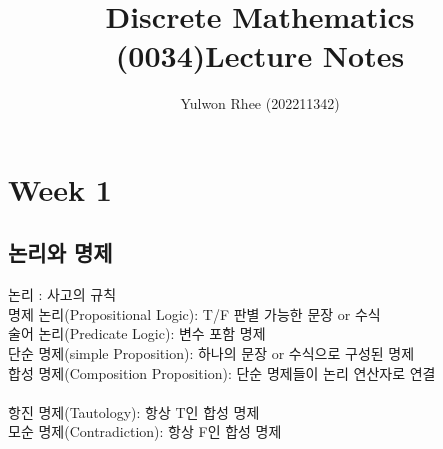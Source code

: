 



\title{Discrete Mathematics (0034)\newline\space Lecture Notes}
\author{Yulwon Rhee (202211342)}

\maketitle
\section{Week 1}
\subsection{논리와 명제}
논리 : 사고의 규칙\\
명제 논리(Propositional Logic): T/F 판별 가능한 문장 or 수식\\
술어 논리(Predicate Logic): 변수 포함 명제\\
단순 명제(simple Proposition): 하나의 문장 or 수식으로 구성된 명제\\
합성 명제(Composition Proposition): 단순 명제들이 논리 연산자로 연결\\\\
항진 명제(Tautology): 항상 T인 합성 명제\\
모순 명제(Contradiction): 항상 F인 합성 명제\\
